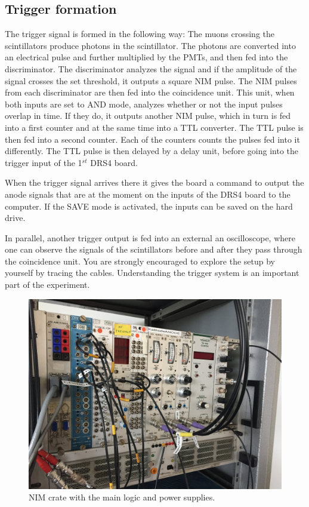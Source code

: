 \documentclass[12pt]{article}
\begin{document}
\subsection{Trigger formation}
The trigger signal is formed in the following way: The muons crossing the scintillators produce photons in the scintillator. The photons are converted into an electrical pulse and further multiplied by the PMTs, and then fed into the discriminator. The discriminator analyzes the signal and if the amplitude of the signal crosses the set threshold, it outputs a square NIM pulse. The NIM pulses from each discriminator are then fed into the coincidence unit. This unit, when both inputs are set to AND mode, analyzes whether or not the input pulses overlap in time.
If they do, it outputs another NIM pulse, which in turn is fed into a first counter and at the same time into a TTL converter. The TTL pulse is then fed into a second counter. Each of the counters counts the pulses fed into it differently. The TTL pulse is then delayed by a delay unit, before going into the trigger input of the 1$^{st}$ DRS4 board.

When the trigger signal arrives there it gives the board a command to output the anode signals that are at the moment on the inputs of the DRS4 board to the computer. If the SAVE mode is activated, the inputs can be saved on the hard drive.

In parallel, another trigger output is fed into an external an oscilloscope, where one can observe the signals of the scintillators before and after they pass through the coincidence unit. You are strongly encouraged to explore the setup by yourself by tracing the cables. Understanding the trigger system is an important part of the experiment. 

\begin{figure}[!h]
\includegraphics[width=13cm]{pics/NIM_crate.JPG}
\centering
\caption{NIM crate with the main logic and power supplies.}
\label{fig:NIM_crate}
\end{figure}
\end{document}
